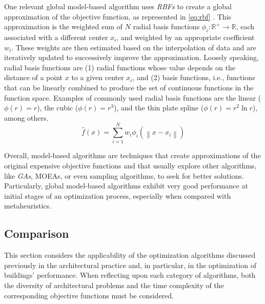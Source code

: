 	One relevant global model-based algorithm uses \textit{\acp{RBF}} to create a global approximation of the objective function, as represented in \cref{eq:rbf} \cite{Forrester2009SBO}. This approximation is the weighted sum of $N$ radial basis functions $\phi_i: \mathbb{R}^+ \to \mathbb{R}$, each associated with a different center $x_i$, and weighted by an appropriate coefficient $w_i$. These weights are then estimated based on the interpolation of data and are iteratively updated to successively improve the approximation. Loosely speaking, radial basis functions are (1) radial functions whose value depends on the distance of a point $x$ to a given center $x_i$, and (2) basis functions, i.e., functions that can be linearly combined to produce the set of continuous functions in the function space. Examples of commonly used radial basis functions are the linear ($\phi(r) = r$), the cubic ($\phi(r) = r^3$), and the thin plate spline ($\phi(r) = r^2 \ln r$), among others.
	\begin{equation}\label{eq:rbf}
		\hat{f}(x) = \sum_{i=1}^{N}w_i\phi_i(\left\lVert x-x_i \right\rVert)
	\end{equation}
	
	Overall, model-based algorithms are techniques that create approximations of the original expensive objective functions and that usually explore other algorithms, like \textit{\acp{GA}}, \acp{MOEA}, or even sampling algorithms, to seek for better solutions. Particularly, global model-based algorithms exhibit very good performance at initial stages of an optimization process, especially when compared with metaheuristics. %
	
	\subsection{Comparison}
	\label{ssec:comparisondfo}
	This section considers the applicability of the optimization algorithms discussed previously in the architectural practice and, in particular, in the optimization of buildings' performance. When reflecting upon each category of algorithms, both the diversity of architectural problems and the time complexity of the corresponding objective functions must be considered.
	
